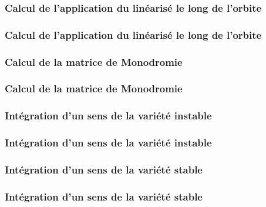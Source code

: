 \documentclass{beamer}
\begin{document}
	\subsubsection{Calcul de l'application du linéarisé le long de l'orbite}
	\begin{frame}
		\frametitle{Calcul de l'application du linéarisé le long de l'orbite}
				
	\end{frame}
	
	\subsubsection{Calcul de la matrice de Monodromie}
	\label{calcul monodromie}
	\begin{frame}
		\frametitle{Calcul de la matrice de Monodromie}
		
	\end{frame}
	
	\subsubsection{Intégration d'un sens de la variété instable}
	\begin{frame}
		\frametitle{Intégration d'un sens de la variété instable}
		
	\end{frame}
	
	\subsubsection{Intégration d'un sens de la variété stable}
	\begin{frame}
		\frametitle{Intégration d'un sens de la variété stable}
		
	\end{frame}
	
	
	
	
	
	
	
	
	
	
	
\end{document}
